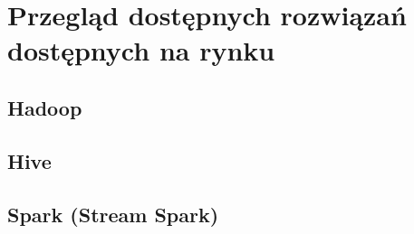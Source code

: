 \section{Przegląd dostępnych rozwiązań dostępnych na rynku}

\subsection{Hadoop}

\subsection{Hive}

\subsection{Spark (Stream Spark)}
